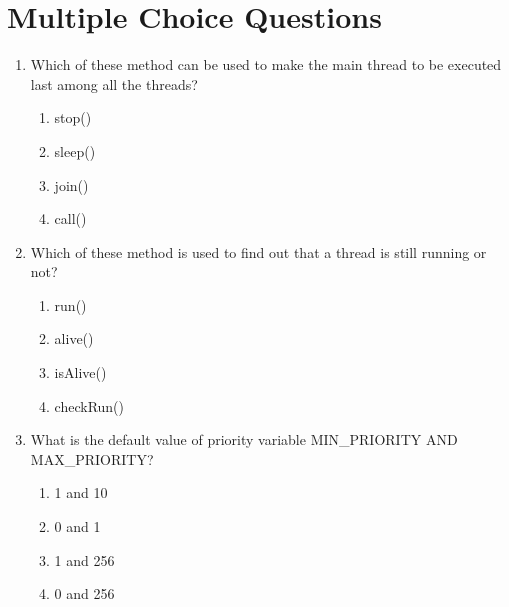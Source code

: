 \documentclass[11pt,a4paper]{article}
\begin{document}
\section*{Multiple Choice Questions}
\begin{enumerate}
\item Which of these method can be used to make the main thread to be executed last among all the threads?
\begin{enumerate}
\item stop()
\item sleep()
\item join()
\item call()
\end{enumerate}
\item Which of these method is used to find out that a thread is still running or not?
\begin{enumerate}
\item run()
\item alive()
\item isAlive()
\item checkRun()
\end{enumerate} 
\item What is the default value of priority variable MIN\_PRIORITY AND MAX\_PRIORITY?
\begin{enumerate}
\item 1 and 10 
\item 0 and 1
\item 1 and 256
\item 0 and 256
\end{enumerate}


\end{enumerate}
\end{document}
